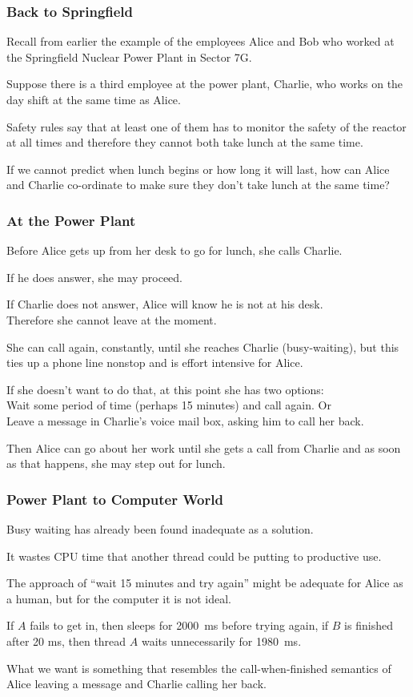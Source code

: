 \begin{frame}
	\frametitle{Back to Springfield}
	Recall from earlier the example of the employees Alice and Bob who worked at the Springfield Nuclear Power Plant in Sector 7G.

	Suppose there is a third employee at the power plant, Charlie, who works on the day shift at the same time as Alice.

	Safety rules say that at least one of them has to monitor the safety of the reactor at all times and therefore they cannot both take lunch at the same time.

	If we cannot predict when lunch begins or how long it will last, how can Alice and Charlie co-ordinate to make sure they don't take lunch at the same time?

\end{frame}

\begin{frame}
	\frametitle{At the Power Plant}

	Before Alice gets up from her desk to go for lunch, she calls Charlie.

	If he does answer, she may proceed.

	If Charlie does not answer, Alice will know he is not at his desk.\\
	\quad Therefore she cannot leave at the moment.

	She can call again, constantly, until she reaches Charlie (busy-waiting), but this ties up a phone line nonstop and is effort intensive for Alice.

	If she doesn't want to do that, at this point she has two options:\\
	\quad Wait some period of time (perhaps 15 minutes) and call again. Or\\
	\quad Leave a message in Charlie's voice mail box, asking him to call her back.

	Then Alice can go about her work until she gets a call from Charlie and as soon as that happens, she may step out for lunch.


\end{frame}

\begin{frame}
	\frametitle{Power Plant to Computer World}

	Busy waiting has already been found inadequate as a solution.

	It wastes CPU time that another thread could be putting to productive use.

	The approach of ``wait 15 minutes and try again'' might be adequate for Alice as a human, but for the computer it is not ideal.

	If $A$ fails to get in, then sleeps for 2000~ms before trying again, if $B$ is finished after 20 ms, then thread $A$ waits unnecessarily for 1980~ms.

	What we want is something that resembles the call-when-finished semantics of Alice leaving a message and Charlie calling her back.

\end{frame}

